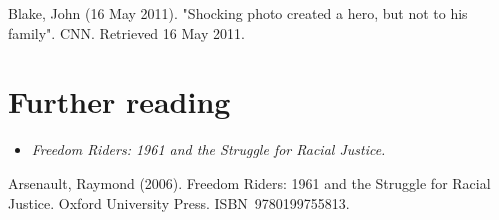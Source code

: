 Blake, John (16 May 2011). "Shocking photo created a hero, but not to
his family". CNN. Retrieved 16 May 2011.

\section{Further reading}\label{further-reading}

\begin{itemize}
\item
  \emph{Freedom Riders: 1961 and the Struggle for Racial Justice.}
\end{itemize}

Arsenault, Raymond (2006). Freedom Riders: 1961 and the Struggle for
Racial Justice. Oxford University Press. ISBN~9780199755813.
